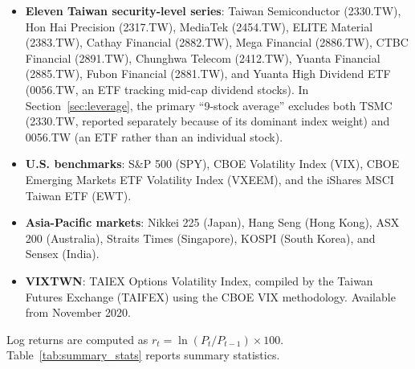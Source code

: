 \begin{itemize}
    \item \textbf{Eleven Taiwan security-level series}: Taiwan Semiconductor (2330.TW), Hon Hai Precision (2317.TW), MediaTek (2454.TW), ELITE Material (2383.TW), Cathay Financial (2882.TW), Mega Financial (2886.TW), CTBC Financial (2891.TW), Chunghwa Telecom (2412.TW), Yuanta Financial (2885.TW), Fubon Financial (2881.TW), and Yuanta High Dividend ETF (0056.TW, an ETF tracking mid-cap dividend stocks). In Section~\ref{sec:leverage}, the primary ``9-stock average'' excludes both TSMC (2330.TW, reported separately because of its dominant index weight) and 0056.TW (an ETF rather than an individual stock).
    \item \textbf{U.S. benchmarks}: S\&P 500 (SPY), CBOE Volatility Index (VIX), CBOE Emerging Markets ETF Volatility Index (VXEEM), and the iShares MSCI Taiwan ETF (EWT).
    \item \textbf{Asia-Pacific markets}: Nikkei 225 (Japan), Hang Seng (Hong Kong), ASX 200 (Australia), Straits Times (Singapore), KOSPI (South Korea), and Sensex (India).
    \item \textbf{VIXTWN}: TAIEX Options Volatility Index, compiled by the Taiwan Futures Exchange (TAIFEX) using the CBOE VIX methodology. Available from November 2020.
\end{itemize}

Log returns are computed as $r_t = \ln(P_t / P_{t-1}) \times 100$. Table~\ref{tab:summary_stats} reports summary statistics.

